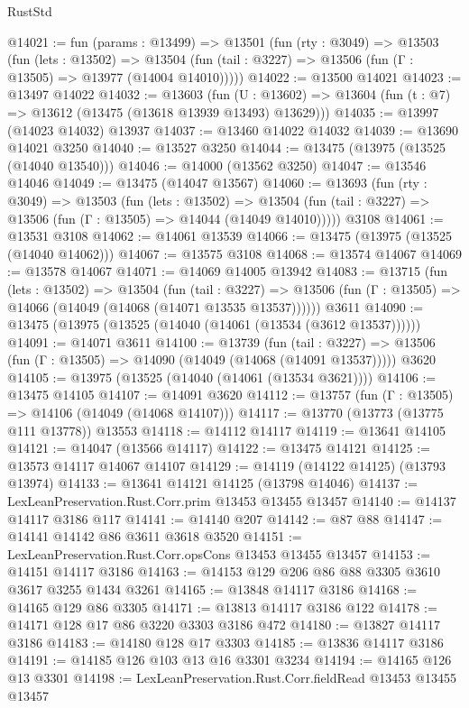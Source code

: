 \begin{lexlean}{RustStd}
\begin{coremodule}
@14021 := fun (params : @13499) =>
  @13501
    (fun (rty : @3049) =>
    @13503
      (fun (lets : @13502) =>
      @13504 (fun (tail : @3227) => @13506 (fun (Γ : @13505) => @13977 (@14004 @14010)))))
@14022 := @13500 @14021
@14023 := @13497 @14022
@14032 := @13603
    (fun (U : @13602) => @13604 (fun (t : @7) => @13612 (@13475 (@13618 @13939 @13493) @13629)))
@14035 := @13997 (@14023 @14032) @13937
@14037 := @13460 @14022 @14032
@14039 := @13690 @14021 @3250
@14040 := @13527 @3250
@14044 := @13475 (@13975 (@13525 (@14040 @13540)))
@14046 := @14000 (@13562 @3250)
@14047 := @13546 @14046
@14049 := @13475 (@14047 @13567)
@14060 := @13693
    (fun (rty : @3049) =>
    @13503
      (fun (lets : @13502) =>
      @13504 (fun (tail : @3227) => @13506 (fun (Γ : @13505) => @14044 (@14049 @14010)))))
    @3108
@14061 := @13531 @3108
@14062 := @14061 @13539
@14066 := @13475 (@13975 (@13525 (@14040 @14062)))
@14067 := @13575 @3108
@14068 := @13574 @14067
@14069 := @13578 @14067
@14071 := @14069 @14005 @13942
@14083 := @13715
    (fun (lets : @13502) =>
    @13504
      (fun (tail : @3227) =>
      @13506 (fun (Γ : @13505) => @14066 (@14049 (@14068 (@14071 @13535 @13537))))))
    @3611
@14090 := @13475 (@13975 (@13525 (@14040 (@14061 (@13534 (@3612 @13537))))))
@14091 := @14071 @3611
@14100 := @13739
    (fun (tail : @3227) => @13506 (fun (Γ : @13505) => @14090 (@14049 (@14068 (@14091 @13537)))))
    @3620
@14105 := @13975 (@13525 (@14040 (@14061 (@13534 @3621))))
@14106 := @13475 @14105
@14107 := @14091 @3620
@14112 := @13757 (fun (Γ : @13505) => @14106 (@14049 (@14068 @14107)))
@14117 := @13770 (@13773 (@13775 @111 @13778)) @13553
@14118 := @14112 @14117
@14119 := @13641 @14105
@14121 := @14047 (@13566 @14117)
@14122 := @13475 @14121
@14125 := @13573 @14117 @14067 @14107
@14129 := @14119 (@14122 @14125) (@13793 @13974)
@14133 := @13641 @14121 @14125 (@13798 @14046)
@14137 := LexLeanPreservation.Rust.Corr.prim @13453 @13455 @13457
@14140 := @14137 @14117 @3186 @117
@14141 := @14140 @207
@14142 := @87 @88
@14147 := @14141 @14142 @86 @3611 @3618 @3520
@14151 := LexLeanPreservation.Rust.Corr.opsCons @13453 @13455 @13457
@14153 := @14151 @14117 @3186
@14163 := @14153 @129 @206 @86 @88 @3305 @3610 @3617 @3255 @1434 @3261
@14165 := @13848 @14117 @3186
@14168 := @14165 @129 @86 @3305
@14171 := @13813 @14117 @3186 @122
@14178 := @14171 @128 @17 @86 @3220 @3303 @3186 @472
@14180 := @13827 @14117 @3186
@14183 := @14180 @128 @17 @3303
@14185 := @13836 @14117 @3186
@14191 := @14185 @126 @103 @13 @16 @3301 @3234
@14194 := @14165 @126 @13 @3301
@14198 := LexLeanPreservation.Rust.Corr.fieldRead @13453 @13455 @13457

\end{coremodule}
\end{lexlean}
